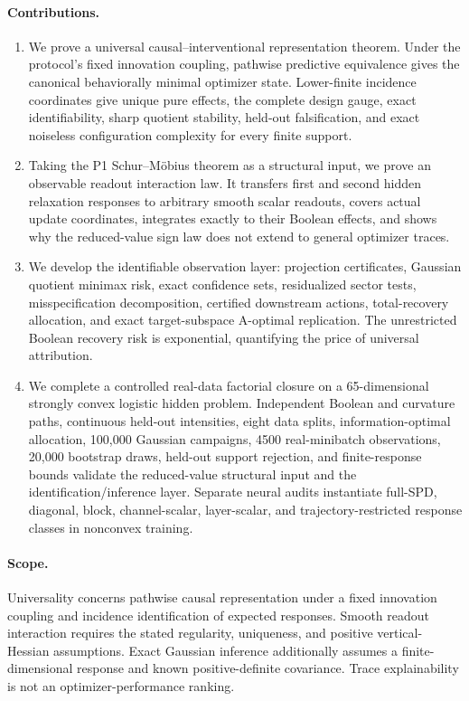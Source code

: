\paragraph{Contributions.}
\begin{enumerate}[leftmargin=*,itemsep=3pt]
\item We prove a universal causal--interventional representation theorem.  Under the protocol's fixed innovation coupling, pathwise predictive equivalence gives the canonical behaviorally minimal optimizer state.  Lower-finite incidence coordinates give unique pure effects, the complete design gauge, exact identifiability, sharp quotient stability, held-out falsification, and exact noiseless configuration complexity for every finite support.
\item Taking the P1 Schur--M\"obius theorem as a structural input, we prove an observable readout interaction law.  It transfers first and second hidden relaxation responses to arbitrary smooth scalar readouts, covers actual update coordinates, integrates exactly to their Boolean effects, and shows why the reduced-value sign law does not extend to general optimizer traces.
\item We develop the identifiable observation layer: projection certificates, Gaussian quotient minimax risk, exact confidence sets, residualized sector tests, misspecification decomposition, certified downstream actions, total-recovery allocation, and exact target-subspace A-optimal replication.  The unrestricted Boolean recovery risk is exponential, quantifying the price of universal attribution.
\item We complete a controlled real-data factorial closure on a 65-dimensional strongly convex logistic hidden problem.  Independent Boolean and curvature paths, continuous held-out intensities, eight data splits, information-optimal allocation, 100,000 Gaussian campaigns, 4500 real-minibatch observations, 20,000 bootstrap draws, held-out support rejection, and finite-response bounds validate the reduced-value structural input and the identification/inference layer.  Separate neural audits instantiate full-SPD, diagonal, block, channel-scalar, layer-scalar, and trajectory-restricted response classes in nonconvex training.
\end{enumerate}

\paragraph{Scope.}
Universality concerns pathwise causal representation under a fixed innovation coupling and incidence identification of expected responses.  Smooth readout interaction requires the stated regularity, uniqueness, and positive vertical-Hessian assumptions.  Exact Gaussian inference additionally assumes a finite-dimensional response and known positive-definite covariance.  Trace explainability is not an optimizer-performance ranking.
